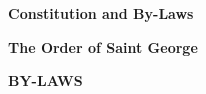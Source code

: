 \documentclass[12pt]{article}
\begin{document}
	
	\centerline{\bf \Large Constitution and By-Laws}
	\vspace{.5pc}
	\centerline{\bf \Large The Order of Saint George}
	
	
	
	
	
	
	
	
	
	
	\newpage
	\centerline{\bf \Large BY-LAWS}
	
	
	
	
	
\end{document}
